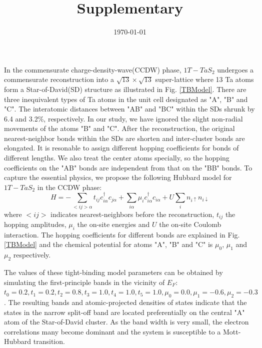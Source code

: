 \documentclass[aps,prl,twocolumn,superscriptaddress]{revtex4}
\begin{document}
\title{Supplementary}

\date{\today}

\maketitle

In the commensurate charge-density-wave(CCDW) phase, $1T-TaS_2$ undergoes a commensurate reconstruction into a $\sqrt{13} \times \sqrt{13}$ super-lattice where 13 Ta atoms form a Star-of-David(SD) structure as illustrated in Fig. \ref{TBModel}. There are three inequivalent types of Ta atoms in the unit cell designated as "A", "B" and "C". The interatomic distances between "AB" and "BC" within the SDs shrunk by 6.4 and 3.2\%, respectively\cite{BROUWER198051}. In our study, we have ignored the slight non-radial movements of the atoms "B" and "C". After the reconstruction, the original nearest-neighbor bonds within the SDs are shorten and inter-cluster bonds are elongated. It is resonable to assign different hopping coefficients for bonds of different lengths. We also treat the center atoms specially, so the hopping coefficients on the "AB" bonds are independent from that on the "BB" bonds. To capture the essential physics, we propose the following Hubbard model for $1T-TaS_2$ in the CCDW phase:
\begin{equation}
H = -\sum_{<ij>\alpha} t_{ij} c_{i\alpha}^{\dagger} c_{j\alpha} + \sum_{i\alpha} \mu_i c_{i\alpha}^{\dagger} c_{i\alpha} + U\sum_{i} n_{i\uparrow} n_{i\downarrow} \label{model_Hamiltonian}
\end{equation}
where $<ij>$ indicates nearest-neighbors before the reconstruction, $t_{ij}$ the hopping amplitudes, $\mu_i$ the on-site energies and $U$ the on-site Coulomb interaction. The hopping coefficients for different bonds are explained in Fig. \ref{TBModel} and the chemical potential for atoms "A", "B" and "C" is $\mu_0$, $\mu_1$ and $\mu_2$ respectively.

The values of these tight-binding model parameters can be obtained by simulating the first-principle bands in the vicinity of $E_F$: $t_0=0.2, t_1=0.2, t_2=0.8, t_3=1.0, t_4=1.0, t_5=1.0, \mu_0=0.0, \mu_1=-0.6, \mu_2=-0.3$. The resulting bands and atomic-projected densities of states indicate that the states in the narrow split-off band are located preferentially on the central "A" atom of the Star-of-David cluster. As the band width is very small, the electron correlations many become dominant and the system is susceptible to a Mott-Hubbard transition.
\end{document}
